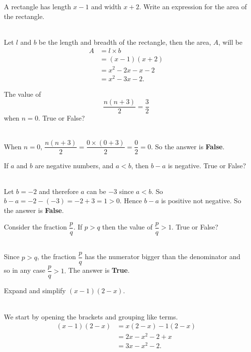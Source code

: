 \documentclass[addpoints,12pt]{exam}
\begin{document}
\begin{questions}
 \question A rectangle has length $x-1$ and width $x+2$. Write an expression for the area of the 
rectangle.
	\ifprintanswers
	  \begin{solution}\\
		Let $l$ and $b$ be the length and breadth of the rectangle, then the area, $A$, will be
		\begin{align*}
		  A &= l \times b \\
		  &= (x-1)(x+2) \\
		  &= x^2 -2x-x-2 \\
		  &= x^2 -3x -2.
		\end{align*}

	  \end{solution}
	\else
	  \makeemptybox{1.33in}
	\fi

 \question The value of $$\frac{n(n + 3)}{2} = \frac{3}{2}$$ when $n = 0$. True or False?
	\ifprintanswers
	  \begin{solution}\\
		When $n=0$, $\dfrac{n(n + 3)}{2} = \dfrac{0\times (0+3)}{2} = \dfrac{0}{2} = 0$. So the 
answer is \textbf{False}.
	  \end{solution}
	\else
	  \makeemptybox{1.33in}
	\fi

 \question If $a$ and $b$ are negative numbers, and $a < b$, then $b - a$ is negative. True or 
False?
	\ifprintanswers
	  \begin{solution}\\
		 Let $b=-2$ and therefore $a$ can be $-3$ since $a<b$. So $b-a=-2-(-3)=-2+3=1>0$. Hence 
$b-a$ is positive not negative. So the answer is \textbf{False}.
	  \end{solution}
	\else
	  \makeemptybox{1.33in}
	\fi
	
	
 \question Consider the fraction $\dfrac{p}{q}.$ If $p > q$ then the value of $\dfrac{p}{q} > 1.$ 
True or False?
	\ifprintanswers
	  \begin{solution}\\
		Since $p>q$, the fraction $\dfrac{p}{q}$ has the numerator bigger than the denominator and 
so in any case $\dfrac{p}{q} > 1.$ The answer is \textbf{True}.
	  \end{solution}
	\else
	  \makeemptybox{1.33in}
	\fi
	
 \question Expand and simplify $(x-1)(2-x)$.
	\ifprintanswers
	  \begin{solution}\\
		We start by opening the brackets and grouping like terms.
		\begin{align*}
		  (x-1)(2-x) &= x(2-x)-1(2-x) \\
		  &= 2x - x^2 -2 +x \\
		  &= 3x - x^2 -2.
		\end{align*}


\end{solution}
\end{questions}
\end{document}
